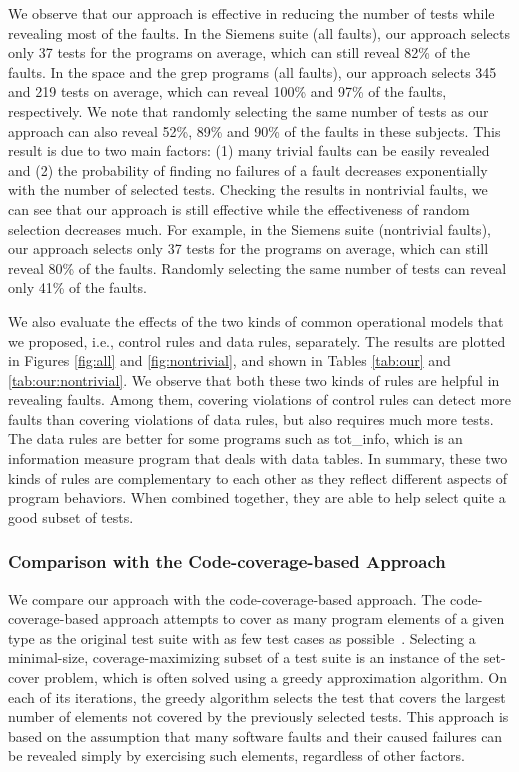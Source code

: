 \documentclass{sig-alternate}
\begin{document}
We observe that our approach is effective in reducing the number of
tests while revealing most of the faults. In the Siemens suite (all
faults), our approach selects only 37 tests for the programs on
average, which can still reveal 82\% of the faults. In the space and
the grep programs (all faults), our approach selects 345 and 219
tests on average, which can reveal 100\% and 97\% of the faults,
respectively. We note that randomly selecting the same number of
tests as our approach can also reveal 52\%, 89\% and 90\% of the
faults in these subjects. This result is due to two main factors:
(1) many trivial faults can be easily revealed and (2) the
probability of finding no failures of a fault decreases
exponentially with the number of selected tests. Checking the
results in nontrivial faults, we can see that our approach is still
effective while the effectiveness of random selection decreases
much. For example, in the Siemens suite (nontrivial faults), our
approach selects only 37 tests for the programs on average, which
can still reveal 80\% of the faults. Randomly selecting the same
number of tests can reveal only 41\% of the faults.

We also evaluate the effects of the two kinds of common operational
models that we proposed, i.e., control rules and data rules,
separately. The results are plotted in Figures \ref{fig:all} and
\ref{fig:nontrivial}, and shown in Tables \ref{tab:our} and
\ref{tab:our:nontrivial}. We observe that both these two kinds of
rules are helpful in revealing faults. Among them, covering
violations of control rules can detect more faults than covering
violations of data rules, but also requires much more tests. The
data rules are better for some programs such as tot\_info, which is
an information measure program that deals with data tables. In
summary, these two kinds of rules are complementary to each other as
they reflect different aspects of program behaviors. When combined
together, they are able to help select quite a good subset of tests.




\subsubsection{Comparison with the Code-coverage-based Approach}

We compare our approach with the code-coverage-based approach. The
code-coverage-based approach attempts to cover as many program
elements of a given type as the original test suite with as few test
cases as possible~\cite{Leon05}. Selecting a minimal-size,
coverage-maximizing subset of a test suite is an instance of the
set-cover problem, which is often solved using a greedy
approximation algorithm. On each of its iterations, the greedy
algorithm selects the test that covers the largest number of
elements not covered by the previously selected tests. This approach
is based on the assumption that many software faults and their
caused failures can be revealed simply by exercising such elements,
regardless of other factors.
\end{document}
